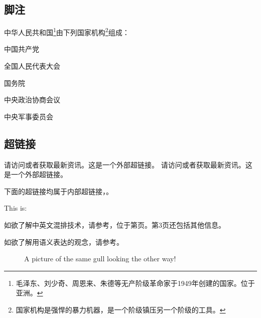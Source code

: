 \subsection{脚注}

中华人民共和国\footnote{毛泽东、刘少奇、周恩来、朱德等无产阶级革命家于1949年创建的国家。位于亚洲。}由下列国家机构\footnote{国家机构是强悍的暴力机器，是一个阶级镇压另一个阶级的工具。}组成：

\begin{Itemize}
\item {中国共产党}
\item {全国人民代表大会}
\item {国务院}
\item {中央政治协商会议}
\item {中央军事委员会}
\end{Itemize}

\subsection{超链接}

请访问或者获取最新资讯。这是一个外部超链接。
请访问或者获取最新资讯。这是一个外部超链接。

下面的超链接均属于内部超链接，。

This is: 

如欲了解中英文混排技术，请参考，位于第页。第3页还包括其他信息。

如欲了解用语义表达的观念，请参考。

\begin{figure}[ht]
  \centering
  \caption{A picture of the same gull looking the other way!}
\end{figure}